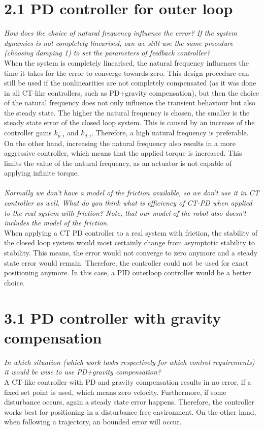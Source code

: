 \section*{2.1 PD controller for outer loop}
\textit{How does the choice of natural frequency influence the error? If the system dynamics is not completely linearised, can we still use the same procedure (choosing damping 1) to set the parameters of feedback controller?}\\
When the system is completely linearised, the natural frequency influences the time it takes for the error to converge towards zero. This design procedure can still be used if the nonlinearities are not completely compensated (as it was done in all CT-like controllers, such as PD+gravity compensation), but then the choice of the natural frequency does not only influence the transient behaviour but also the steady state. The higher the natural frequency is chosen, the smaller is the steady state error of the closed loop system. This is caused by an increase of the controller gains $k_{p,i}$ and $k_{d,i}$. Therefore, a high natural frequency is preferable. On the other hand, increasing the natural frequency also results in a more aggressive controller, which means that the applied torque is increased. This limits the value of the natural frequency, as an actuator is not capable of applying infinite torque.\\\\
\textit{Normally we don't have a model of the friction available, so we don't use it in CT controller as well. What do you think what is efficiency of CT-PD when applied to the real system with friction? Note, that our model of the robot also doesn't includes the model of the friction.}\\
When applying a CT PD controller to a real system with friction, the stability of the closed loop system would most certainly change from asymptotic stability to stability. This means, the error would not converge to zero anymore and a steady state error would remain. Therefore, the controller could not be used for exact positioning anymore. In this case, a PID outerloop controller would be a better choice.
\section*{3.1 PD controller with gravity compensation}
\textit{In which situation (which work tasks respectively for which control requirements) it would be wise to use PD+gravity compensation?}\\
A CT-like controller with PD and gravity compensation results in no error, if a fixed set point is used, which means zero velocity. Furthermore, if some disturbance occurs, again a steady state error happens. Therefore, the controller works best for positioning in a disturbance free environment. On the other hand, when following a trajectory, an bounded error will occur.
